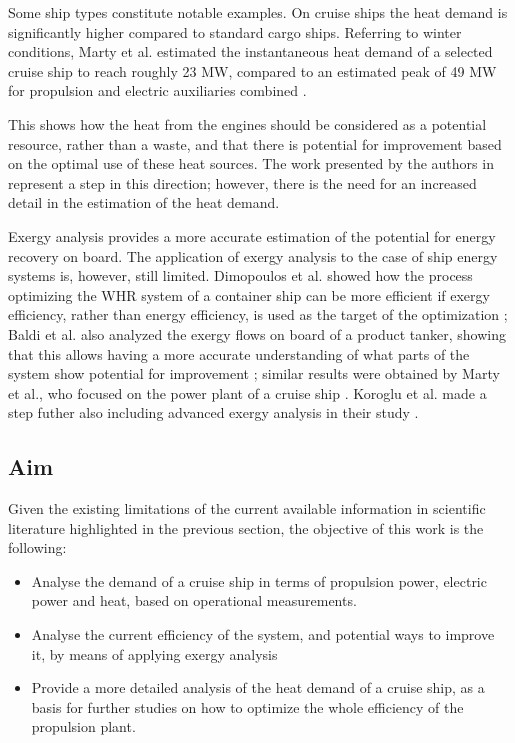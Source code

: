 \documentclass[preprint,12pt]{elsarticle}
\begin{document}
Some ship types constitute notable examples. On cruise ships the heat demand is significantly higher compared to standard cargo ships. Referring to winter conditions, Marty et al. estimated the instantaneous heat demand of a selected cruise ship to reach roughly 23 MW, compared to an estimated peak of 49 MW for propulsion and electric auxiliaries combined \cite{Marty2012}.  


This shows how the heat from the engines should be considered as a potential resource, rather than a waste, and that there is potential for improvement based on the optimal use of these heat sources. The work presented by the authors in \cite{Baldi2016} represent a step in this direction; however, there is the need for an increased detail in the estimation of the heat demand. 

Exergy analysis provides a more accurate estimation of the potential for energy recovery on board. The application of exergy analysis to the case of ship energy systems is, however, still limited. Dimopoulos et al. showed how the process optimizing the WHR system of a container ship can be more efficient if exergy efficiency, rather than energy efficiency, is used as the target of the optimization \cite{Dimopoulos2012}; Baldi et al. also analyzed the exergy flows on board of a product tanker, showing that this allows having a more accurate understanding of what parts of the system show potential for improvement \cite{Baldi2015a}; similar results were obtained by Marty et al., who focused on the power plant of a cruise ship \cite{Marty2016}. Koroglu et al. made a step futher also including advanced exergy analysis in their study \cite{Koroglu2017}.



\subsection{Aim}

Given the existing limitations of the current available information in scientific literature highlighted in the previous section, the objective of this work is the following:
\begin{itemize}
	\item Analyse the demand of a cruise ship in terms of propulsion power, electric power and heat, based on operational measurements.
	\item Analyse the current efficiency of the system, and potential ways to improve it, by means of applying exergy analysis
	\item Provide a more detailed analysis of the heat demand of a cruise ship, as a basis for further studies on how to optimize the whole efficiency of the propulsion plant.
\end{itemize}
\end{document}
